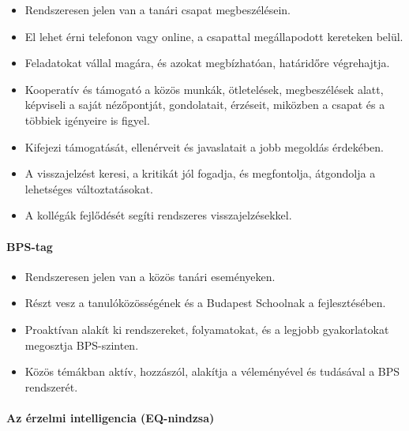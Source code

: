 \begin{itemize}
\tightlist
\item
  Rendszeresen jelen van a tanári csapat megbeszélésein.
\item
  El lehet érni telefonon vagy online, a csapattal megállapodott
  kereteken belül.
\item
  Feladatokat vállal magára, és azokat megbízhatóan, határidőre
  végrehajtja.
\item
  Kooperatív és támogató a közös munkák, ötletelések, megbeszélések
  alatt, képviseli a saját nézőpontját, gondolatait, érzéseit, miközben
  a csapat és a többiek igényeire is figyel.
\item
  Kifejezi támogatását, ellenérveit és javaslatait a jobb megoldás
  érdekében.
\item
  A visszajelzést keresi, a kritikát jól fogadja, és megfontolja,
  átgondolja a lehetséges változtatásokat.
\item
  A kollégák fejlődését segíti rendszeres visszajelzésekkel.
\end{itemize}

\hypertarget{bps-tag}{%
\paragraph{BPS-tag}\label{bps-tag}}

\begin{itemize}
\tightlist
\item
  Rendszeresen jelen van a közös tanári eseményeken.
\item
  Részt vesz a tanulóközösségének és a Budapest Schoolnak a
  fejlesztésében.
\item
  Proaktívan alakít ki rendszereket, folyamatokat, és a legjobb
  gyakorlatokat megosztja BPS-szinten.
\item
  Közös témákban aktív, hozzászól, alakítja a véleményével és tudásával
  a BPS rendszerét.
\end{itemize}

\hypertarget{az-erzelmi-intelligencia-eq-nindzsa}{%
\paragraph{Az érzelmi intelligencia (EQ-nindzsa)}\label{az-erzelmi-intelligencia-eq-nindzsa}}

